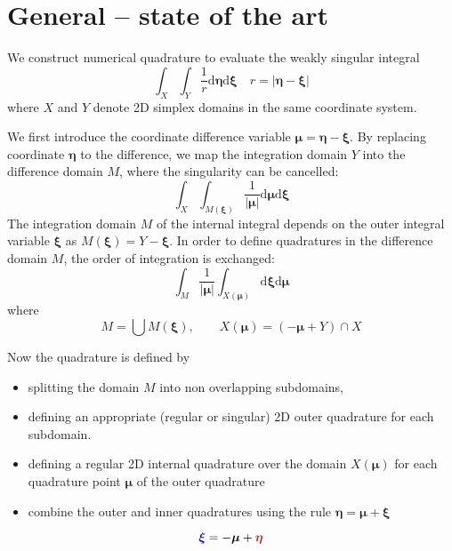\documentclass{article}
\newcommand{\td}{\mathrm{d}}
\begin{document}
\section{General -- state of the art}

We construct numerical quadrature to evaluate the weakly singular integral
%
\begin{equation}
\int_X
\int_Y
\frac{1}{r}
\td \bm{\eta}
\td \bm{\xi}
\quad
r = |\bm{\eta}-\bm{\xi}|
\end{equation}
%
where $X$ and $Y$ denote 2D simplex domains in the same coordinate system.


We first introduce the coordinate difference variable $\bm{\mu} = \bm{\eta}-\bm{\xi}$.
By replacing coordinate $\bm{\eta}$ to the difference, we map the integration domain $Y$ into the difference domain $M$, where the singularity can be cancelled:
%
\begin{equation}
\int_X
\int_{M(\bm{\xi})}
\frac{1}{|\bm{\mu}|}
\td \bm{\mu}
\td \bm{\xi}
\end{equation}
%
The integration domain $M$ of the internal integral depends on the outer integral variable $\bm{\xi}$ as $M(\bm{\xi}) = Y - \bm{\xi}$. In order to define quadratures in the difference domain $M$, the order of integration is exchanged:
%
\begin{equation}
\int_{M}
\frac{1}{|\bm{\mu}|}
\int_{X(\bm{\mu})}
\td \bm{\xi}
\td \bm{\mu}
\end{equation}
%
where
%
\begin{equation}
M = \bigcup M(\bm{\xi}),
\qquad
X({\bm{\mu}}) = (-\bm{\mu} + Y) \cap X
\end{equation}

Now the quadrature is defined by
\begin{itemize}
	\item splitting the domain $M$ into non overlapping subdomains,
	\item defining an appropriate (regular or singular) 2D outer quadrature for each subdomain.
	\item defining a regular 2D internal quadrature over the domain $X(\bm{\mu})$ for each quadrature point $\bm{\mu}$ of the outer quadrature
	\item combine the outer and inner quadratures using the rule $\bm{\eta} = \bm{\mu} + \bm{\xi}$
\end{itemize}



\begin{equation}
{\color{blue}\bm{\xi}} = -\bm{\mu} + {\color{red}\bm{\eta}}
\end{equation}
\end{document}
